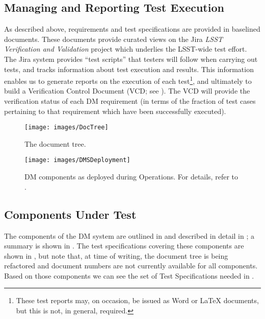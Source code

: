 \subsection{Managing and Reporting Test Execution}
\label{sect:reports}

As described above, requirements and test specifications are provided in baselined documents.
These documents provide curated views on the Jira \emph{LSST Verification and Validation} project which underlies the LSST-wide test effort.
The Jira system provides ``test scripts'' that testers will follow when carrying out tests, and tracks information about test execution and results.
This information enables us to generate reports on the execution of each test\footnote{These test reports may, on occasion, be issued as Word or \LaTeX{} documents, but this is not, in general, required.}, and ultimately to build a Verification Control Document (VCD; see ).
The VCD will provide the verification status of each DM requirement (in terms of the fraction of test cases pertaining to that requirement which have been successfully executed).

\begin{figure}
\begin{center}
 \texttt{[image: images/DocTree]}

 \caption{The \product{} document tree.}
 \label{fig:doctree}

\end{center}
\end{figure}

\begin{figure}[htbp]
	\begin{center}
		\texttt{[image: images/DMSDeployment]}
		\caption{DM components as deployed during Operations. For details, refer to .
		\label{fig:dmsdeploy}}
	\end{center}
\end{figure}

\subsection{Components Under Test}
\label{sect:components}

The components of the DM system are outlined in  and described in detail in ; a summary is shown in .
The test specifications covering these components are shown in , but note that, at time of writing, the document tree is being refactored and document numbers are not currently available for all components.
Based on those components we can see the set of Test Specifications needed in .

